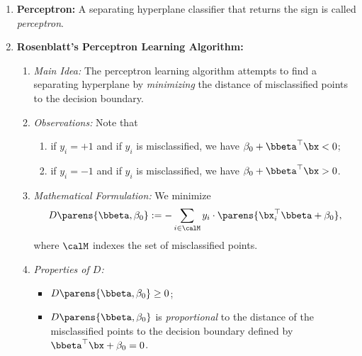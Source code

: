 \documentclass[12pt]{article}
\begin{document}
\begin{enumerate}[label=\textbf{\arabic*.}]
	\item \textbf{Perceptron:} A separating hyperplane classifier that returns the sign is called \textit{perceptron}. 
	
	\item \textbf{Rosenblatt's Perceptron Learning Algorithm:} 
	\begin{enumerate}
		\item \textit{Main Idea:} The perceptron learning algorithm attempts to find a separating hyperplane by \emph{minimizing} the distance of misclassified points to the decision boundary. 
		\item \textit{Observations:} Note that 
		\begin{enumerate}
			\item if $y_i = +1$ and if $y_i$ is misclassified, we have $\beta_0 + \bbeta^\top \bx < 0$; 
			\item if $y_i = -1$ and if $y_i$ is misclassified, we have $\beta_0 + \bbeta^\top \bx > 0$. 
		\end{enumerate}
		\item \textit{Mathematical Formulation:} We minimize 
		\begin{align}
			D \parens{\bbeta, \beta_0} := - \sum_{i \in \calM} y_i \cdot \parens{\bx^\top_i \bbeta + \beta_0}, 
		\end{align}
		where $\calM$ indexes the set of misclassified points. 
		
		\item \textit{Properties of $D$:}
		\begin{itemize}
			\item $D \parens{\bbeta, \beta_0} \ge 0$; 
			\item $D \parens{\bbeta, \beta_0}$ is \textit{proportional} to the distance of the misclassified points to the decision boundary defined by $\bbeta^\top \bx + \beta_0 = 0$. 
		\end{itemize}
		

\end{enumerate}
\end{enumerate}
\end{document}
